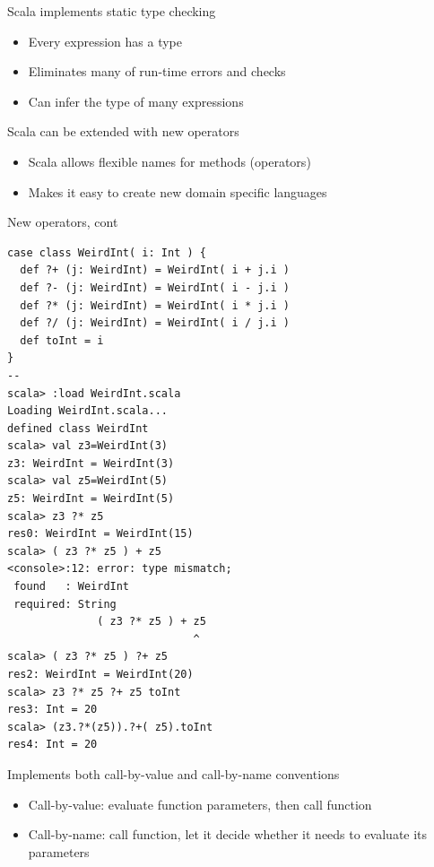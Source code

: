 \documentclass[t]{beamer}
\begin{document}
\begin{frame}{Scala implements static type checking}
  \begin{itemize}
  \item Every expression has a type
  \item Eliminates many of run-time errors and checks
  \item Can infer the type of many expressions
  \end{itemize}
\note{}
 \end{frame}

\begin{frame}{Scala can be extended with new operators}
  \begin{itemize}
  \item Scala allows flexible names for methods (operators)
  \item Makes it easy to create new domain specific languages
  \end{itemize}
\note{}
 \end{frame}

\begin{frame}[fragile]{New operators, cont}
  \begin{tiny}
  \begin{verbatim}
case class WeirdInt( i: Int ) {
  def ?+ (j: WeirdInt) = WeirdInt( i + j.i )
  def ?- (j: WeirdInt) = WeirdInt( i - j.i )
  def ?* (j: WeirdInt) = WeirdInt( i * j.i )
  def ?/ (j: WeirdInt) = WeirdInt( i / j.i )
  def toInt = i
}
--
scala> :load WeirdInt.scala
Loading WeirdInt.scala...
defined class WeirdInt
scala> val z3=WeirdInt(3)
z3: WeirdInt = WeirdInt(3)
scala> val z5=WeirdInt(5)
z5: WeirdInt = WeirdInt(5)
scala> z3 ?* z5
res0: WeirdInt = WeirdInt(15)
scala> ( z3 ?* z5 ) + z5
<console>:12: error: type mismatch;
 found   : WeirdInt
 required: String
              ( z3 ?* z5 ) + z5
                             ^
scala> ( z3 ?* z5 ) ?+ z5
res2: WeirdInt = WeirdInt(20)
scala> z3 ?* z5 ?+ z5 toInt
res3: Int = 20
scala> (z3.?*(z5)).?+( z5).toInt
res4: Int = 20
  \end{verbatim}
  \end{tiny}
  \note{}
\end{frame}


\begin{frame}{Implements both call-by-value and call-by-name conventions}
  \begin{itemize}
  \item Call-by-value: evaluate function parameters, then call function
  \item Call-by-name: call function, let it decide whether it needs to
    evaluate its parameters
  \end{itemize}
  \note{}
\end{frame}
\end{document}
